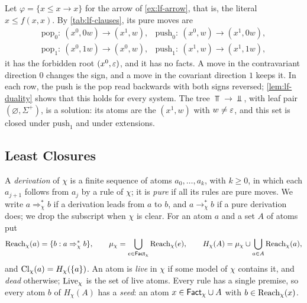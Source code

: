 \begin{example}\label{ex:lf-clauses}
Let $\varphi=\{x\le x\to x\}$ for the arrow of \cref{ex:lf-arrow}, that is,
the literal $x\le f(x,x)$. By \cref{tab:lf-clauses}, its pure moves are
\[
\begin{array}{ll}
 \mathrm{pop}_0:\ (x^0,0w)\to(x^1,w), & \mathrm{push}_0:\ (x^0,w)\to(x^1,0w),\\
 \mathrm{pop}_1:\ (x^0,1w)\to(x^0,w), & \mathrm{push}_1:\ (x^1,w)\to(x^1,1w),
\end{array}
\]
it has the forbidden root $(x^0,\varepsilon)$, and it has no facts. A move
in the contravariant direction $0$ changes the sign, and a move in the
covariant direction $1$ keeps it. In each row, the push is the pop read
backwards with both signs reversed; \cref{lem:lf-duality} shows that this
holds for every system. The tree $\Top\to\Bot$, with leaf pair
$(\varnothing,\Sigma^+)$, is a solution: its atoms are the $(x^1,w)$ with
$w\ne\varepsilon$, and this set is closed under $\mathrm{push}_1$ and under
extensions.
\end{example}

\subsection{Least Closures}\label{sec:lf-least}

A \emph{derivation} of $\chi$ is a finite sequence of atoms $a_0,\dots,a_k$,
with $k\ge0$, in which each $a_{j+1}$ follows from $a_j$ by a rule of $\chi$;
it is \emph{pure} if all its rules are pure moves. We write
$a\Rightarrow^*_\chi b$ if a derivation leads from $a$ to $b$, and
$a\to^*_\chi b$ if a pure derivation does; we drop the subscript when $\chi$
is clear. For an atom $a$ and a set $A$ of atoms put
\[
 \operatorname{Reach}_\chi(a)=\{b:a\Rightarrow^*_\chi b\},\qquad
 \mu_\chi=\bigcup_{e\in\mathsf{Fact}_\chi}\operatorname{Reach}_\chi(e),\qquad
 H_\chi(A)=\mu_\chi\cup\bigcup_{a\in A}\operatorname{Reach}_\chi(a),
\]
and $\operatorname{Cl}_\chi(a)=H_\chi(\{a\})$. An atom is \emph{live} in $\chi$ if some
model of $\chi$ contains it, and \emph{dead} otherwise; $\operatorname{Live}_\chi$ is the
set of live atoms. Every rule has a single premise, so every atom $b$ of
$H_\chi(A)$ has a \emph{seed}: an atom $x\in\mathsf{Fact}_\chi\cup A$ with
$b\in \operatorname{Reach}_\chi(x)$.

